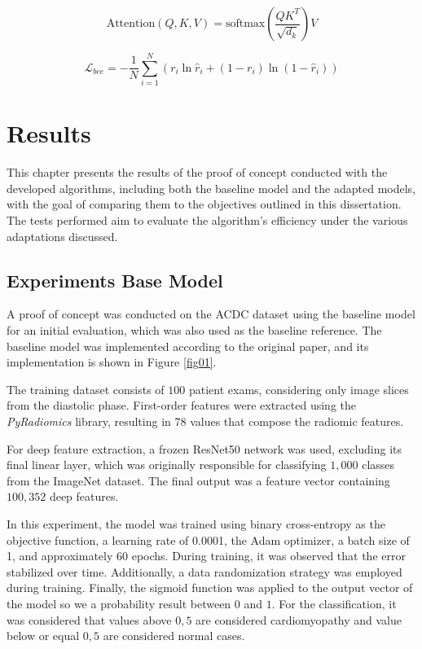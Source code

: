 \documentclass[journal,twoside,web]{ieeecolor}
\begin{document}
\begin{equation}
\text{Attention}(Q, K, V) = \text{softmax}\left(\frac{QK^T}{\sqrt{d_k}}\right)V
\label{eq:attention}
\end{equation}

\begin{equation}
\mathcal{L}_{bce} = -\frac{1}{N} \sum_{i=1}^N
(r_i \ln \hat{r}_i + (1 - r_i) \ln (1 - \hat{r}_i))
\label{eq:bce}
\end{equation}


\section{Results}

This chapter presents the results of the proof of concept conducted with the developed algorithms, including both the baseline model and the adapted models, with the goal of comparing them to the objectives outlined in this dissertation. The tests performed aim to evaluate the algorithm's efficiency under the various adaptations discussed.

\subsection{Experiments Base Model}

A proof of concept was conducted on the ACDC dataset using the baseline model for an initial evaluation, which was also used as the baseline reference. The baseline model was implemented according to the original paper, and its implementation is shown in Figure \ref{fig01}.  

The training dataset consists of $100$ patient exams, considering only image slices from the diastolic phase. First-order features were extracted using the \textit{PyRadiomics} library, resulting in 78 values that compose the radiomic features.  

For deep feature extraction, a frozen ResNet50 network was used, excluding its final linear layer, which was originally responsible for classifying $1,000$ classes from the ImageNet dataset. The final output was a feature vector containing $100,352$ deep features.  

In this experiment, the model was trained using binary cross-entropy as the objective function, a learning rate of 0.0001, the Adam optimizer, a batch size of 1, and approximately 60 epochs. During training, it was observed that the error stabilized over time. Additionally, a data randomization strategy was employed during training. Finally, the sigmoid function was applied to the output vector of the model so we a probability result between $0$ and $1$. For the classification, it was considered that values above $0,5$ are considered cardiomyopathy and value below or equal $0,5$ are considered normal cases.
\end{document}

